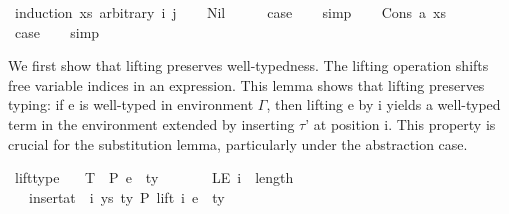 \begin{isabellebody}
%
\isadelimproof
%
\endisadelimproof
%
\isatagproof
{}\isamarkupfalse%
\ {\isacharparenleft}{\kern0pt}induction\ xs\ arbitrary{\isacharcolon}{\kern0pt}\ i\ j{\isacharparenright}{\kern0pt}\isanewline
\ \ \isamarkupfalse%
\ Nil\isanewline
\ \ \isamarkupfalse%
\ \isamarkupfalse%
\ {\isacharquery}{\kern0pt}case\isanewline
\ \ \isamarkupfalse%
\ simp\isanewline
{}\isamarkupfalse%
\isanewline
\ \ \isamarkupfalse%
\ {\isacharparenleft}{\kern0pt}Cons\ a\ xs{\isacharparenright}{\kern0pt}\isanewline
\ \ \isamarkupfalse%
\ \isamarkupfalse%
\ {\isacharquery}{\kern0pt}case\isanewline
\ \ \isamarkupfalse%
\ simp\isanewline
{}\isamarkupfalse%
%
\endisatagproof
{\isafoldproof}%
%
\isadelimproof
%
\endisadelimproof
%
\isadelimdocument
%
\endisadelimdocument
%
\isatagdocument
%
\isamarkuptrue%
%
\isamarkuptrue%
%
\endisatagdocument
{\isafolddocument}%
%
\isadelimdocument
%
\endisadelimdocument
%
\begin{isamarkuptext}%
We first show that lifting preserves well-typedness.
  The lifting operation shifts free variable indices in an expression.
  This lemma shows that lifting preserves typing:
  if e is well-typed in environment $\Gamma$,
  then lifting e by i yields a well-typed term in the environment
  extended by inserting $\tau$' at position i.
  This property is crucial for the substitution lemma,
  particularly under the abstraction case.%
\end{isamarkuptext}\isamarkuptrue%
\isamarkupfalse%
\ lift{\isacharunderscore}{\kern0pt}type{\isacharcolon}{\kern0pt}\isanewline
\ \ \ T{\isacharcolon}{\kern0pt}\ {\isachardoublequoteopen}{\isasymGamma}\ {\isasymturnstile}{\isacharbraceleft}{\kern0pt}P{\isacharbraceright}{\kern0pt}\ e\ {\isacharcolon}{\kern0pt}\ ty{\isachardoublequoteclose}\isanewline
\ \ \ \ \ \ \ LE{\isacharcolon}{\kern0pt}\ {\isachardoublequoteopen}i\ {\isasymle}\ length\ {\isasymGamma}{\isachardoublequoteclose}\isanewline
\ \ \ {\isachardoublequoteopen}insert{\isacharunderscore}{\kern0pt}at\ {\isasymGamma}\ i\ {\isacharparenleft}{\kern0pt}ys{\isacharcomma}{\kern0pt}\ ty{}{\isacharparenright}{\kern0pt}\ {\isasymturnstile}{\isacharbraceleft}{\kern0pt}P{\isacharbraceright}{\kern0pt}\ {\isacharparenleft}{\kern0pt}lift\ i\ e{\isacharparenright}{\kern0pt}\ {\isacharcolon}{\kern0pt}\ ty{\isachardoublequoteclose}\isanewline

\end{isabellebody}
